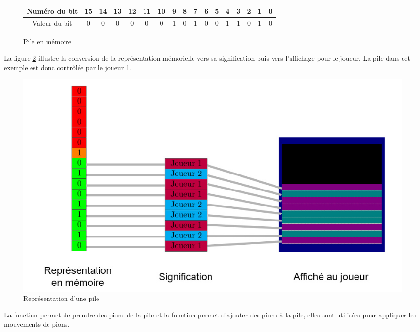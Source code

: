 \documentclass[article, backcover, french, nodocumentinfo]{upmethodology-document}
\begin{document}
					\begin{figure}[H]
						\begin{center}
							\begin{tabular}{|c|c|c|c|c|c|c|c|c|c|c|c|c|c|c|c|c|}
								\hline
								Numéro du bit & 15 & 14 & 13 & 12 & 11 & 10 & 9 & 8 & 7 & 6 & 5 & 4 & 3 & 2 & 1 & 0\\
								\hline
								Valeur du bit & 0\cellcolor{red} & 0\cellcolor{red} & 0\cellcolor{red} & 0\cellcolor{red} & 0\cellcolor{red} & 0\cellcolor{red} & 1\cellcolor{orange} & 0\cellcolor{green} & 1\cellcolor{green} & 0\cellcolor{green} & 0\cellcolor{green} & 1\cellcolor{green} & 1\cellcolor{green} & 0\cellcolor{green} & 1\cellcolor{green} & 0\cellcolor{green}\\
								\hline
							\end{tabular}
						\end{center}
						\caption{Pile en mémoire}
						\label{fig:pile_mémoire}
					\end{figure}
					La figure \ref{fig:pile_représentation} illustre la conversion de la représentation mémorielle vers sa signification puis vers l'affichage pour le joueur. La pile dans cet exemple est donc contrôlée par le joueur 1.
					\begin{figure}[H]
						\centering
						\includegraphics[width=\textwidth]{figures/pile}
						\caption{Représentation d'une pile}
						\label{fig:pile_représentation}
					\end{figure}
					La fonction  permet de prendre des pions de la pile et la fonction  permet d'ajouter des pions à la pile, elles sont utilisées pour appliquer les mouvements de pions.
\end{document}
